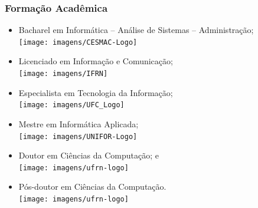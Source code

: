 \documentclass[aspectratio=169]{beamer}
\begin{document}
\begin{frame}
	\frametitle{Formação Acadêmica}

	\begin{itemize}
		\item Bacharel em Informática -- Análise de Sistemas -- Administração;\\
		\texttt{[image: imagens/CESMAC-Logo]}
		
		\item Licenciado em Informa\c cão e Comunica\c cão;\\
		\texttt{[image: imagens/IFRN]}
		
		\item Especialista em Tecnologia da Informação;\\
		\texttt{[image: imagens/UFC\_Logo]}
		
		\item Mestre em Informática Aplicada;\\
		\texttt{[image: imagens/UNIFOR-Logo]}
		
		\item Doutor em Ciências da Computação; e\\
		\texttt{[image: imagens/ufrn-logo]}
		
		\item Pós-doutor em Ciências da Computação.\\
		\texttt{[image: imagens/ufrn-logo]}
	\end{itemize}
\end{frame}
\end{document}
